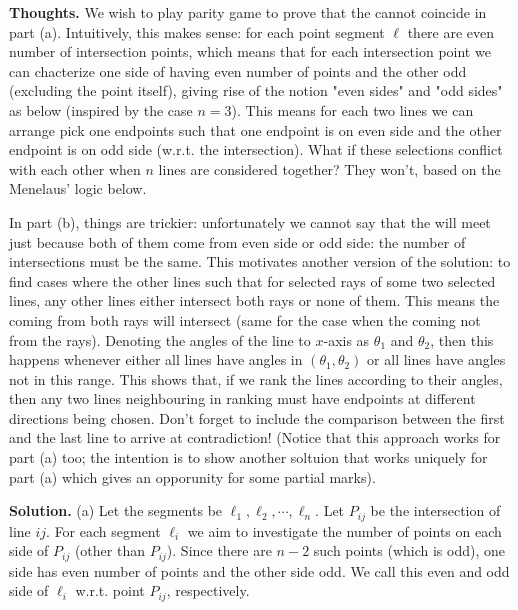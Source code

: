 \documentclass[11pt,a4paper]{article}
\begin{document}
\begin{itemize}
\textbf{Thoughts.} 
We wish to play parity game to prove that the \animals cannot coincide in part (a). 
Intuitively, this makes sense: 
for each point segment $\ell$ there are even number of intersection points, 
which means that for each intersection point we can chacterize one side of having even number of points and the other odd 
(excluding the point itself), giving rise of the notion "even sides" and "odd sides" as below (inspired by the case $n=3$). 
This means for each two lines we can arrange pick one endpoints such that one endpoint is on even side and the other endpoint is on odd side (w.r.t. the intersection). 
What if these selections conflict with each other when $n$ lines are considered together? 
They won't, based on the Menelaus' logic below. 

In part (b), things are trickier: unfortunately we cannot say that the \animals will meet just because both of them come from even side or odd side: the number of intersections must be the same. 
This motivates another version of the solution: 
to find cases where the other lines such that for selected rays of some two selected lines, any other lines either intersect both rays or none of them. 
This means the \animals coming from both rays will intersect (same for the case when the \animals coming not from the rays). 
Denoting the angles of the line to $x$-axis as $\theta_1$ and $\theta_2$, then this happens whenever either all lines have angles in $(\theta_1, \theta_2)$ or all lines have angles not in this range. 
This shows that, if we rank the lines according to their angles, then any two lines neighbouring in ranking must have endpoints at different directions being chosen. 
Don't forget to include the comparison between the first and the last line to arrive at contradiction!
(Notice that this approach works for part (a) too; the intention is to show another soltuion that works uniquely for part (a) which gives an opporunity for some partial marks). 

\textbf{Solution.} (a) Let the segments be $\ell_1, \ell_2, \cdots , \ell_n$. 
Let $P_{ij}$ be the intersection of line $ij$. For each segment $\ell_i$ we aim to investigate the number of points on each side of $P_{ij}$ (other than $P_{ij}$). 
Since there are $n-2$ such points (which is odd), 
one side has even number of points and the other side odd. 
We call this even and odd side of $\ell_i$ w.r.t. point $P_{ij}$, respectively. 


\end{itemize}
\end{document}
